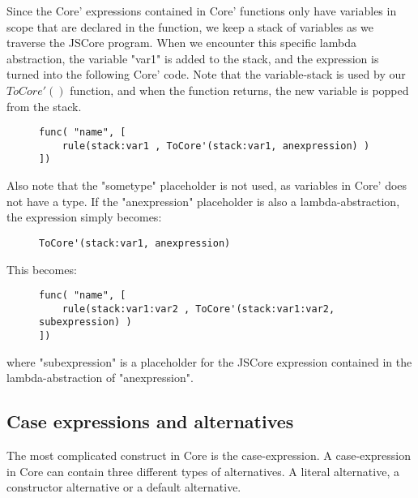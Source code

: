 Since the Core' expressions contained in Core' functions only have variables in 
scope that are declared in the function, we keep a stack of variables as we traverse
the JSCore program. When we encounter this specific lambda abstraction, the variable
"var1" is added to the stack, and the expression is turned into the following Core' code. 
Note that the variable-stack is used by our $ToCore'()$ function, and when
the function returns, the new variable is popped from the stack.

\begin{figure}[H]
\lstset{ %
language=Haskell,
}
\begin{lstlisting}
func( "name", [
    rule(stack:var1 , ToCore'(stack:var1, anexpression) )
])
\end{lstlisting}
\end{figure}

Also note that the "sometype" placeholder is not used, as variables in Core' does
not have a type. If the "anexpression" placeholder is also a lambda-abstraction, the
expression simply becomes:

\begin{figure}[H]
\lstset{ %
language=Haskell,
}
\begin{lstlisting}
ToCore'(stack:var1, anexpression)
\end{lstlisting}
\end{figure}

This becomes:

\begin{figure}[H]
\lstset{ %
language=Haskell,
}
\begin{lstlisting}
func( "name", [
    rule(stack:var1:var2 , ToCore'(stack:var1:var2, subexpression) )
])
\end{lstlisting}
\end{figure}

where "subexpression" is a placeholder for the JSCore expression contained in the 
lambda-abstraction of "anexpression".


\subsection*{Case expressions and alternatives}

The most complicated construct in Core is the case-expression. A case-expression
in Core can contain three different types of alternatives. A literal alternative,
a constructor alternative or a default alternative. 

